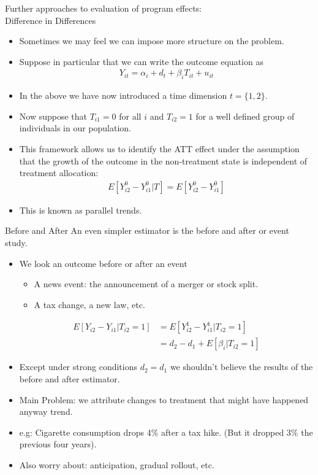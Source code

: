 \documentclass[xcolor=pdftex,dvipsnames,table,mathserif]{beamer}
\begin{document}
\begin{frame}{Further approaches to evaluation of program effects: \\
{\small Difference in Differences } }
\begin{itemize}
\item Sometimes we may feel we can impose more structure on the problem.
\item Suppose in particular that we can write the outcome equation as
\begin{align*}
 Y_{it} =\alpha_i +d_t +\beta_i T_{it} +u_{it}
 \end{align*}
\item In the above we have now introduced a time dimension $t=\{1,2\}$. 
\item Now suppose that $T_{i1}=0$ for all $i$ and $T_{i2}=1$ for a well defined group of individuals in our population.
\item This framework allows us to identify the ATT effect under the assumption that the growth of the outcome in the non-treatment state is independent of treatment allocation:
\begin{align*}
E[Y_{i2}^0 - Y_{i1}^0 | T] = E[Y_{i2}^0 - Y_{i1}^0] 
\end{align*}
\item This is known as \alert{parallel trends}.
\end{itemize}
\end{frame}

\begin{frame}{Before and After} 
An even simpler estimator is the \alert{before and after} or \alert{event study}.
\begin{itemize}
\item We look an outcome before or after an event
\begin{itemize}
\item A news event: the announcement of a merger or stock split.
\item A tax change, a new law, etc.
\end{itemize}
\begin{align*}
E[Y_{i2} - Y_{i1} | T_{i2}=1] & = E[Y_{i2}^1 - Y_{i1}^1 | T_{i2}=1] \\
 &= d_2-d_1 + E[\beta_{i}| T_{i2}=1] 
\end{align*}
\item Except under strong conditions $d_2 = d_1$ we shouldn't believe the results of the before and after estimator.
\item Main Problem: we attribute changes to treatment that might have happened anyway \alert{trend}.
\item e.g: Cigarette consumption drops 4\% after a tax hike. (But it dropped 3\% the previous four years).
\item Also worry about: \alert{anticipation}, \alert{gradual rollout}, etc.
\end{itemize}
\end{frame}
\end{document}
